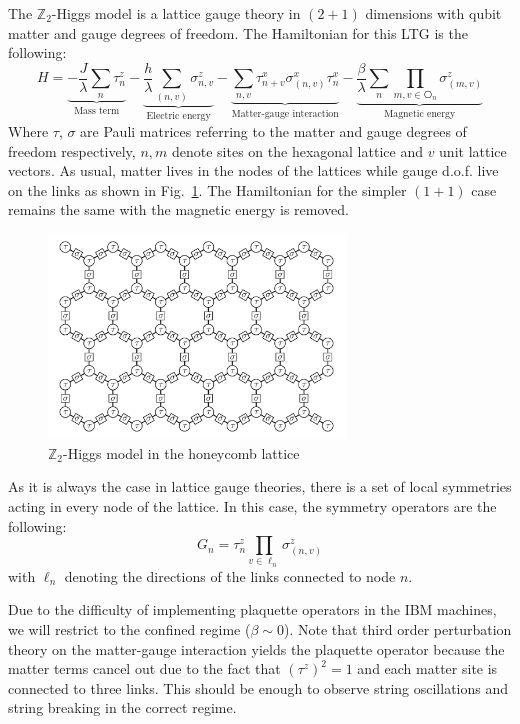 \documentclass[a4paper]{article}
\begin{document}
The $\mathbb{Z}_2$-Higgs model is a lattice gauge theory in $(2+1)$ dimensions with qubit matter and gauge degrees of freedom. The Hamiltonian for this LTG is the following:
%
\begin{equation}
    H = \underbrace{-\frac{J}{\lambda} \sum_{n} \tau_{n}^z}_{\text{Mass term}} - \underbrace{\frac{h}{\lambda} \sum_{(n, v)} \sigma_{n, v}^{z}}_{\text{Electric energy}} - \underbrace{\sum_{n, v} \tau_{n + v}^x \sigma_{(n, v)}^x \tau_{n}^x}_{\text{Matter-gauge interaction}} - \underbrace{\frac{\beta}{\lambda} \sum_{n} \prod_{m, v \in \hexagon_n} \sigma_{(m, v)}^z}_{\text{Magnetic energy}}
    \label{eq:hamiltonian}
\end{equation}
%
Where $\tau$, $\sigma$ are Pauli matrices referring to the matter and gauge degrees of freedom respectively, $n, m$ denote sites on the hexagonal lattice and $v$ unit lattice vectors. As usual, matter lives in the nodes of the lattices while gauge d.o.f. live on the links as shown in Fig.~\ref{fig:lattice}. The Hamiltonian for the simpler $(1+1)$ case remains the same with the magnetic energy is removed.

\begin{figure}[!ht]
    \centering
    \includegraphics[width=0.7\textwidth]{honeycomb.pdf}
    \caption{$\mathbb{Z}_2$-Higgs model in the honeycomb lattice}
    \label{fig:lattice}
\end{figure}

As it is always the case in lattice gauge theories, there is a set of local symmetries acting in every node of the lattice. In this case, the symmetry operators are the following:
%
\begin{equation}
    G_n = \tau_n^z \prod_{v \in \ell_n} \sigma_{(n, v)}^z
\end{equation}
%
with $\ell_n$ denoting the directions of the links connected to node $n$.

Due to the difficulty of implementing plaquette operators in the IBM machines, we will restrict to the confined regime ($\beta \sim 0$). Note that third order perturbation theory on the matter-gauge interaction yields the plaquette operator because the matter terms cancel out due to the fact that $(\tau^z)^2 = 1$ and each matter site is connected to three links. This should be enough to observe string oscillations and string breaking in the correct regime.
\end{document}
